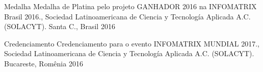 



\begin{cvhonors}

  \cvhonor
    {Medalha} %
    {Medalha de Platina pelo projeto GANHADOR 2016 na INFOMATRIX Brasil 2016., Sociedad Latinoamericana de Ciencia y Tecnología Aplicada A.C. (SOLACYT).} %
    {Santa C., Brasil} %
    {2016} %

  \cvhonor
    {Credenciamento} %
    {Credenciamento para o evento INFOMATRIX MUNDIAL 2017., Sociedad Latinoamericana de Ciencia y Tecnología Aplicada A.C. (SOLACYT).} %
    {Bucareste, Romênia} %
    {2016} %
\end{cvhonors}




